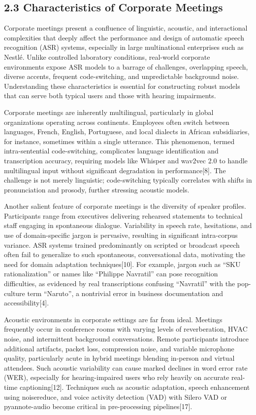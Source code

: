 \documentclass[12pt,a4paper]{article}
\begin{document}
\subsection{2.3 Characteristics of Corporate Meetings}


Corporate meetings present a confluence of linguistic, acoustic, and interactional complexities that deeply affect the performance and design of automatic speech recognition (ASR) systems, especially in large multinational enterprises such as Nestlé. Unlike controlled laboratory conditions, real-world corporate environments expose ASR models to a barrage of challenges, overlapping speech, diverse accents, frequent code-switching, and unpredictable background noise. Understanding these characteristics is essential for constructing robust models that can serve both typical users and those with hearing impairments.


Corporate meetings are inherently multilingual, particularly in global organizations operating across continents. Employees often switch between languages, French, English, Portuguese, and local dialects in African subsidiaries, for instance, sometimes within a single utterance. This phenomenon, termed intra-sentential code-switching, complicates language identification and transcription accuracy, requiring models like Whisper and wav2vec 2.0 to handle multilingual input without significant degradation in performance[8]. The challenge is not merely linguistic; code-switching typically correlates with shifts in pronunciation and prosody, further stressing acoustic models.


Another salient feature of corporate meetings is the diversity of speaker profiles. Participants range from executives delivering rehearsed statements to technical staff engaging in spontaneous dialogue. Variability in speech rate, hesitations, and use of domain-specific jargon is pervasive, resulting in significant intra-corpus variance. ASR systems trained predominantly on scripted or broadcast speech often fail to generalize to such spontaneous, conversational data, motivating the need for domain adaptation techniques[10]. For example, jargon such as “SKU rationalization” or names like “Philippe Navratil” can pose recognition difficulties, as evidenced by real transcriptions confusing “Navratil” with the pop-culture term “Naruto”, a nontrivial error in business documentation and accessibility[4].


Acoustic environments in corporate settings are far from ideal. Meetings frequently occur in conference rooms with varying levels of reverberation, HVAC noise, and intermittent background conversations. Remote participants introduce additional artifacts, packet loss, compression noise, and variable microphone quality, particularly acute in hybrid meetings blending in-person and virtual attendees. Such acoustic variability can cause marked declines in word error rate (WER), especially for hearing-impaired users who rely heavily on accurate real-time captioning[12]. Techniques such as acoustic adaptation, speech enhancement using noisereduce, and voice activity detection (VAD) with Silero VAD or pyannote-audio become critical in pre-processing pipelines[17].
\end{document}
